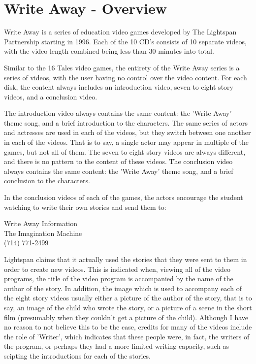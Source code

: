 \chapter{Write Away - Overview}

Write Away is a series of education video games developed by The Lightspan Partnership starting in 1996. Each of the 10 CD's consists of 10 separate videos, with the video length combined being less than 30 minutes into total.

Similar to the 16 Tales video games, the entirety of the Write Away series is a series of videos, with the user having no control over the video content. For each disk, the content always includes an introduction video, seven to eight story videos, and a conclusion video.

The introduction video always contains the same content: the 'Write Away' theme song, and a brief introduction to the characters. The same series of actors and actresses are used in each of the videos, but they switch between one another in each of the videos. That is to say, a single actor may appear in multiple of the games, but not all of them. The seven to eight story videos are always different, and there is no pattern to the content of these videos. The conclusion video always contains the same content: the 'Write Away' theme song, and a brief conclusion to the characters.

In the conclusion videos of each of the games, the actors encourage the student watching to write their own stories and send them to:

\begin{center}
    Write Away Information\\
    The Imagination Machine\\
    (714) 771-2499
\end{center}

Lightspan claims that it actually used the stories that they were sent to them in order to create new videos. This is indicated when, viewing all of the video programs, the title of the video program is accompanied by the name of the author of the story. In addition, the image which is used to accompany each of the eight story videos usually either a picture of the author of the story, that is to say, an image of the child who wrote the story, or a picture of a scene in the short film (presumably when they couldn't get a picture of the child). Although I have no reason to not believe this to be the case, credits for many of the videos include the role of 'Writer', which indicates that these people were, in fact, the writers of the program, or perhaps they had a more limited writing capacity, such as scipting the introductions for each of the stories.

